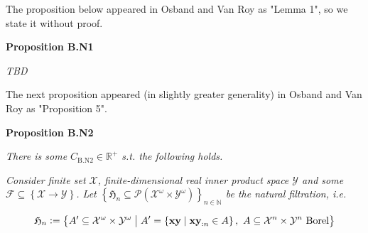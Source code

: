 \documentclass[a4paper]{article}
\newcommand{\Co}[1]{}
\DeclareMathOperator{\Supp}{supp}
\newcommand{\AP}[1]{\left(#1\right)}
\newcommand{\AC}[1]{\left\{#1\right\}}
\newcommand{\ACM}[2]{\left\{#1\;\middle\vert\;#2\right\}}
\newcommand{\E}[1]{\underset{#1}{\operatorname{E}}}
\newcommand{\PS}[1]{\mathcal{P}\AP{#1}}
\newcommand{\D}{\mathrm{d}}
\newcommand{\Nats}{\mathbb{N}}
\newcommand{\Reals}{\mathbb{R}}
\newcommand{\Abs}[1]{\left\vert #1 \right\vert}
\newcommand{\K}{\xrightarrow{\mathrm{k}}}
\newcommand{\X}{\mathcal{X}}
\newcommand{\Y}{\mathcal{Y}}
\newcommand{\F}{\mathcal{F}}
\newcommand{\A}{\mathcal{A}}
\newcommand{\V}{\mathrm{V}}
\newcommand{\EU}{\mathrm{EU}}
\begin{document}
The proposition below appeared in Osband and Van Roy as "Lemma 1", so we state it without proof.

\textbf{Proposition B.N1}\Co{b}

\textit{TBD}\Co{i}

\Co{...

\textbf{Proposition B.N3}\Co{b}

Consider some $\gamma\in(0,1)$, $\tau\in(0,\infty)$, $T\in\Nats^+$, a universe..., some $\pi^*: ? \rightarrow \A$ and some $\pi^0: ? \K \A$. Assume that $\gamma \geq \gamma_M$. For any $n \in \Nats$, let $\pi^*_n$ be a policy s.t. for any $h \in ?$

$$\pi^*_n(h):=\begin{cases} \pi^0(h) \text{ if } \Abs{h} < nT \\ \pi^*(h) \text{ otherwise} \end{cases}$$

Assume that for any $h \in ?$

i. $$\pi^*(s) \in \A_{M}^\omega\AP{S(h)}$$

ii. $$\Supp{\pi^0(h)} \subseteq \A_{M}^0\AP{S(h)}$$

iii. For any $\theta\in(\gamma,1)$ $$\Abs{\frac{\D\V_{M}\AP{S(h),\theta}}{\D\theta}} \leq \tau$$

Then

$$\EU^{*}_\upsilon(\gamma)-\EU^{\pi^0}_\upsilon(\gamma) \leq (1-\gamma)\sum_{n=0}^\infty \sum_{m=0}^{T-1} \gamma^{nT+m}\left(\E{x\sim\mu\bowtie\pi^*_n}\left[r\left(x_{:nT+m}\right)\right]-\E{x\sim\mu\bowtie\pi^0}\left[r\left(x_{:nT+m}\right)\right]\right) + \frac{2\tau\gamma^T(1-\gamma)}{1-\gamma^T}$$}

The next proposition appeared (in slightly greater generality) in Osband and Van Roy as "Proposition 5".

\textbf{Proposition B.N2}\Co{b}

\textit{There is some $C_{\mathrm{B.N2}}\in\Reals^+$ s.t. the following holds.}\Co{i}

\textit{Consider finite set $\X$, finite-dimensional real inner product space $\Y$ and some $\F\subseteq\AC{\X\rightarrow\Y}$. Let $\AC{\mathfrak{H}_n\subseteq\PS{\X^\omega\times\Y^\omega}}_{n\in\Nats}$ be the natural filtration, i.e.}\Co{i}

$$\mathfrak{H}_n:=\ACM{A'\subseteq\X^\omega\times\Y^\omega}{A'=\ACM{\bold{xy}}{\bold{xy}_{:n}\in A},\ A\subseteq\X^n\times\Y^n\text{ Borel}}$$
\end{document}
